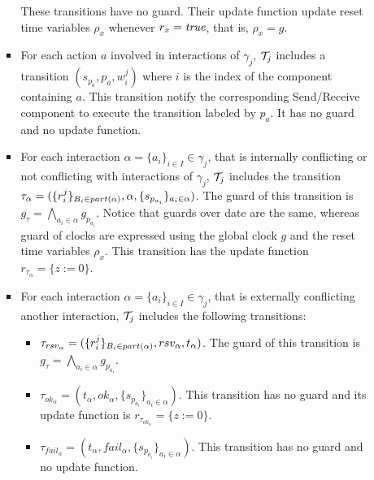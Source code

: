 \begin{definition}[Scheduler]
\begin{itemize}
\begin{itemize}
\begin{itemize}
              These transitions have no guard. Their update function update reset time variables
              $\rho_x$ whenever $r_x=\textnormal{\textit{true}}$, that is, $\rho_x=g$. 
            \item For each action $a$ involved in interactions of $\gamma_j$, $\mathcal{T}_j$ includes
              a transition $(s_{p_a},p_a,w_i^j)$ where $i$ is the index of the component
              containing $a$. This transition notify the corresponding Send/Receive component 
              to execute the transition labeled by $p_a$. It has no guard and no update function.
            \item For each interaction $\alpha=\{a_i\}_{i\in{I}}\in\gamma_j$, that is 
              internally conflicting or not conflicting with interactions of $\gamma_j$,
              $\mathcal{T}_j$ includes the transition $\tau_{\alpha}=(\{r_i^j\}_{B_i\in part(\alpha)},
              \alpha,\{s_{p_{a_i}}\}_{a_i\in\alpha})$. The guard of this transition is $g_{\tau}=
              \bigwedge_{a_i\in\alpha}g_{p_{a_i}}$. Notice that guards over date are the same,
              whereas guard of clocks are expressed using the global clock $g$ and the reset
              time variables $\rho_x$. This transition has the update function 
              $r_{\tau_{\alpha}}=\{z:=0\}$.
            \item For each interaction $\alpha=\{a_i\}_{i\in{I}}\in\gamma_j$, that is 
              externally conflicting another interaction,
              $\mathcal{T}_j$ includes the following transitions:
              \begin{itemize}
                \item $\tau_{rsv_{\alpha}}=(\{r_i^j\}_{B_i\in part(\alpha)},rsv_{\alpha},t_{\alpha}
                  )$. The guard of this transition is $g_{\tau}=\bigwedge_{a_i\in\alpha}
                  g_{p_{a_i}}$.
                \item $\tau_{ok_{\alpha}}=(t_{\alpha},ok_{\alpha},\{s_{p_{a_i}}\}_{a_i\in\alpha})
                  $. This transition has no guard and its update function is 
                  $r_{\tau_{ok_{\alpha}}}=\{z:=0\}$.
                \item $\tau_{fail_{\alpha}}=(t_{\alpha},fail_{\alpha},\{s_{p_{a_i}}\}_{a_i
                  \in\alpha})$. This transition has no guard and no update function.
              \end{itemize}
          \end{itemize}
      \end{itemize}
  \end{itemize}
\end{definition}
